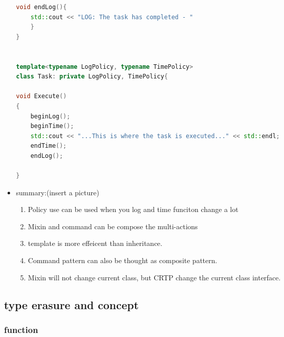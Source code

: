 \documentclass[a4paper,12pt,twoside]{book}
\begin{document}
\begin{itemize}
\begin{lstlisting}[frame=single, language=c++]
	void endLog(){
	std::cout << "LOG: The task has completed - "
	}
}


template<typename LogPolicy, typename TimePolicy>
class Task: private LogPolicy, TimePolicy{

void Execute()
{
	beginLog();
	beginTime();
	std::cout << "...This is where the task is executed..." << std::endl;
	endTime();
	endLog();

}

\end{lstlisting}

\item summary:(insert a picture)
\begin{enumerate}
	\item Policy use can be used when you log and time funciton change a lot
	\item Mixin and command can be compose the multi-actions
	\item template is more effeicent than inheritance. 
	\item Command pattern can also be thought as composite pattern.
	\item Mixin will not change current class, but CRTP change the current class interface.
\end{enumerate}


\end{itemize}

\subsection{type erasure and concept}
\subsubsection{function}
\end{document}
